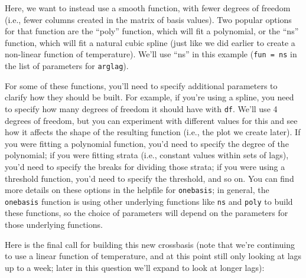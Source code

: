 \documentclass[
]{book}
\newenvironment{Shaded}{\begin{snugshade}}{\end{snugshade}}
\newcommand{\AttributeTok}[1]{\textcolor[rgb]{0.77,0.63,0.00}{#1}}
\newcommand{\DecValTok}[1]{\textcolor[rgb]{0.00,0.00,0.81}{#1}}
\newcommand{\FunctionTok}[1]{\textcolor[rgb]{0.00,0.00,0.00}{#1}}
\newcommand{\NormalTok}[1]{#1}
\newcommand{\OtherTok}[1]{\textcolor[rgb]{0.56,0.35,0.01}{#1}}
\newcommand{\SpecialCharTok}[1]{\textcolor[rgb]{0.00,0.00,0.00}{#1}}
\newcommand{\StringTok}[1]{\textcolor[rgb]{0.31,0.60,0.02}{#1}}
\begin{document}
Here, we want to instead use a smooth function, with fewer degrees of freedom (i.e., fewer
columns created in the matrix of basis values). Two popular options for that function are
the ``poly'' function, which will fit a polynomial, or the ``ns'' function, which will fit
a natural cubic spline (just like we did earlier to create a non-linear function of
temperature). We'll use ``ns'' in this example (\texttt{fun\ =\ ns} in the list of parameters for
\texttt{arglag}).

For some of these functions, you'll need to specify additional parameters to clarify
how they should be built. For example, if you're using a spline, you need to specify
how many degrees of freedom it should have with \texttt{df}. We'll use 4 degrees of freedom,
but you can experiment with different values for this and see how it affects the shape
of the resulting function (i.e., the plot we create later). If you were fitting a
polynomial function,
you'd need to specify the degree of the polynomial; if you were fitting strata (i.e.,
constant values within sets of lags), you'd need to specify the breaks for dividing
those strata; if you were using a threshold function, you'd need to specify the threshold,
and so on. You can find more details on these options in the helpfile for \texttt{onebasis};
in general, the \texttt{onebasis} function is using other underlying functions like \texttt{ns} and
\texttt{poly} to build these functions, so the choice of parameters will depend on the parameters
for those underlying functions.

Here is the final call for building this new crossbasis (note that we're continuing to
use a linear function of temperature, and at this point still only looking at lags up to
a week; later in this question we'll expand to look at longer lags):

\begin{Shaded}
\end{Shaded}
\end{document}
